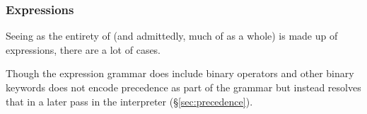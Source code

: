 \subsubsection{Expressions}
\label{sec:expressions}

Seeing as the entirety of \Poetry{} (and admittedly, much of \Trilogy{} as a whole)
is made up of expressions, there are a lot of cases.

Though the expression grammar does include binary operators and other binary keywords
\Trilogy{} does not encode precedence as part of the grammar but instead resolves that
in a later pass in the interpreter (\S\ref{sec:precedence}).

\begin{bnf*}
     \\
     \\
     \\
     \\
     \\
     \\
     \\
\end{bnf*}
